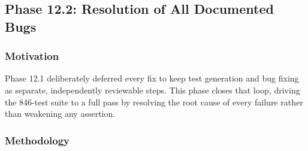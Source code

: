 \documentclass[12pt]{article}
\begin{document}
\subsection{Phase 12.2: Resolution of All Documented Bugs}
\label{sec:phase12.2}

\subsubsection{Motivation}

Phase 12.1 deliberately deferred every fix to keep test generation and bug fixing as separate, independently reviewable steps. This phase closes that loop, driving the 846-test suite to a full pass by resolving the root cause of every failure rather than weakening any assertion.

\subsubsection{Methodology}
\end{document}
